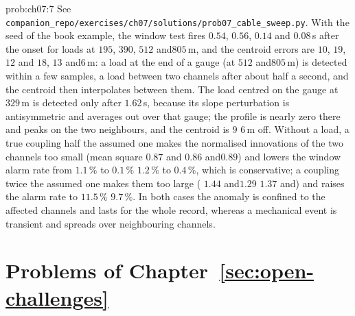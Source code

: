 \documentclass[graybox,envcountchap]{style/SNmono}
\newcommand{\repopath}[1]{\texttt{#1}}
\providecommand{\DIFadd}[1]{{\protect\color{blue} #1}} %
\providecommand{\DIFdel}[1]{{\protect\color{red} #1}} %
\providecommand{\DIFaddbegin}{} %
\providecommand{\DIFaddend}{} %
\providecommand{\DIFdelbegin}{} %
\providecommand{\DIFdelend}{} %
\begin{document}
\begin{sol}{prob:ch07:7}
See \repopath{companion\_\allowbreak repo/\allowbreak exercises/\allowbreak ch07/\allowbreak solutions/\allowbreak prob07\_\allowbreak cable\_\allowbreak sweep.py}. With the seed of the book example, the window test fires  $0.54$, $0.56$, $0.14$ and\DIFdelbegin \DIFdel{$0.08$}\DIFdelend \DIFaddbegin \allowbreak \DIFadd{$0.06$}\DIFaddend \,s after the onset for loads at $195$, $390$, $512$ and\DIFaddbegin \allowbreak \DIFaddend $805$\,m, and the centroid errors are  $10$, \DIFdelbegin \DIFdel{$19$, $12$ and}\DIFdelend \DIFaddbegin \DIFadd{$18$, $13$ and}\allowbreak \DIFaddend $6$\,m: a load at the end of a gauge (at $512$ and\DIFaddbegin \allowbreak \DIFaddend $805$\,m) is detected within a few samples, a load between two channels after about half a second, and the centroid then interpolates between them. The load centred on the gauge at $329$\,m is detected only after $1.62$\,s, because its slope perturbation is antisymmetric and averages out over that gauge; the profile is nearly zero there and peaks on the two neighbours, and the centroid is \DIFdelbegin \DIFdel{$9$}\DIFdelend \DIFaddbegin \DIFadd{$6$}\DIFaddend \,m off. Without a load, a true coupling half the assumed one makes the normalised innovations of the two channels too small (mean square  \DIFdelbegin \DIFdel{$0.87$ and}\DIFdelend \DIFaddbegin \DIFadd{$0.86$ and}\allowbreak \DIFaddend $0.89$) and lowers the window alarm rate from \DIFdelbegin \DIFdel{$1.1\,\%$ to $0.1\,\%$}\DIFdelend \DIFaddbegin \DIFadd{$1.2\,\%$ to $0.4\,\%$}\DIFaddend , which is conservative; a coupling twice the assumed one makes them too large ( \DIFdelbegin \DIFdel{$1.44$ and$1.29$}\DIFdelend \DIFaddbegin \DIFadd{$1.37$ and}\allowbreak \DIFadd{$1.31$}\DIFaddend ) and raises the alarm rate to \DIFdelbegin \DIFdel{$11.5\,\%$}\DIFdelend \DIFaddbegin \DIFadd{$9.7\,\%$}\DIFaddend . In both cases the anomaly is confined to the affected channels and lasts for the whole record, whereas a mechanical event is transient and spreads over neighbouring channels.
\end{sol}


\section*{Problems of Chapter~\ref{sec:open-challenges}}
\end{document}
